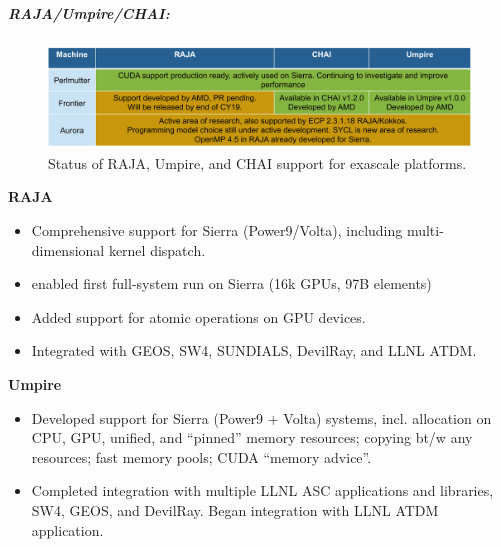 \begin{itemize}
\end{itemize}

\subparagraph{RAJA/Umpire/CHAI:}
\begin{figure}[htb]
\centering
\includegraphics[width=\textwidth]{projects/2.3.6-NNSA/2.3.6.02-LLNL-ATDM/raja-umpire-chai-support}
\caption{
Status of RAJA, Umpire, and CHAI support for exascale platforms.
}
\end{figure}

{\bf RAJA}
\begin{itemize}
\item Comprehensive support for Sierra (Power9/Volta),
      including multi-dimensional kernel dispatch.
\item enabled first full-system run on Sierra (16k GPUs, 97B elements)
\item Added support for atomic operations on GPU devices.
\item Integrated with GEOS, SW4, SUNDIALS, DevilRay, and LLNL ATDM.
\end{itemize}

{\bf Umpire}
\begin{itemize}
\item Developed support for Sierra (Power9 + Volta) systems, incl. allocation
      on CPU, GPU, unified, and “pinned” memory resources; copying bt/w any
      resources; fast memory pools; CUDA ``memory advice''.
\item Completed integration with multiple LLNL ASC applications and libraries,
      SW4, GEOS, and DevilRay. Began integration with LLNL ATDM application.
\end{itemize}

